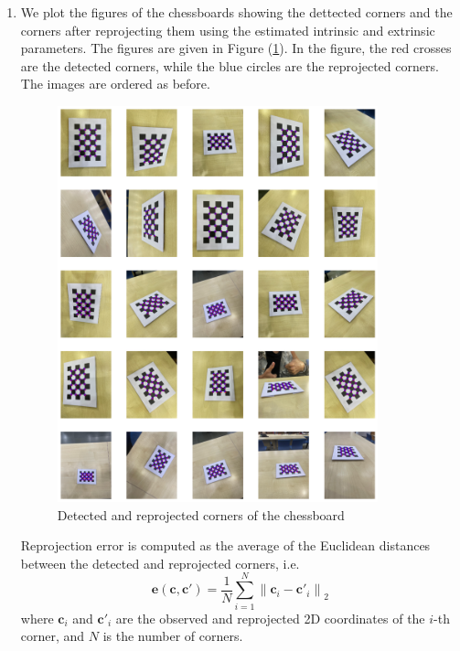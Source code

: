 \documentclass[10pt]{article}
\newcommand{\figref}[1]{Figure (\ref{fig:#1})}
\begin{document}
\begin{enumerate}
        \item We plot the figures of the chessboards showing the dettected corners and the
        corners after reprojecting them using the estimated intrinsic and extrinsic parameters.
        The figures are given in \figref{corners}. In the figure, the red crosses are the
        detected corners, while the blue circles are the reprojected corners. The images are
        ordered as before.
        \begin{figure}[htbp]
            \begin{center}
                \includegraphics[width=0.875\textwidth]{Assets/Question-4/corners.png}
                \caption{Detected and reprojected corners of the chessboard}
                \label{fig:corners}
            \end{center}
        \end{figure}
        Reprojection error is computed as the average of the Euclidean distances between the
        detected and reprojected corners, i.e.
        \begin{equation*}
            \mathbf{e}(\mathbf{c}, \mathbf{c'}) =
            \frac{1}{N} \sum_{i=1}^{N} \left\| \mathbf{c}_{i} - \mathbf{c'}_{i} \right\|_{2}
        \end{equation*}
        where $\mathbf{c}_{i}$ and $\mathbf{c'}_{i}$ are the observed and reprojected
        2D coordinates of the $i$-th corner, and $N$ is the number of corners.


\end{enumerate}
\end{document}
